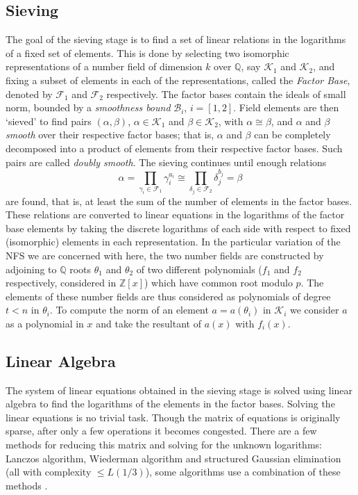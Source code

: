 \documentclass[a4paper, 10pt, envcountsect, runningheads]{lms}
\newcommand{\Q}{\mathbb{Q}}
\newcommand{\Z}{\mathbb{Z}}
\numberwithin{figure}{section}
\numberwithin{equation}{section}
\begin{document}
\subsection*{Sieving}
\label{ss:sieving}
The goal of the sieving stage is to find a set of linear relations in the logarithms of a fixed set of elements. This is done by selecting two isomorphic representations of a number field of dimension $k$ over $\Q$, say $\mathcal{K}_{1}$ and $\mathcal{K}_{2}$, and fixing a subset of elements in each of the representations, called the \textit{Factor Base}, denoted by $\mathcal{F}_{1}$ and $\mathcal{F}_{2}$ respectively. The factor bases contain the ideals of small norm, bounded by a {\em smoothness bound} $\mathcal{B}_{i}$, $i=[1,2]$.
Field elements are then `sieved' to find pairs $(\alpha,\beta)$, $\alpha\in\mathcal{K}_{1}$ and $\beta\in\mathcal{K}_{2}$, with $\alpha\cong\beta$, and $\alpha$ and $\beta$ {\em smooth} over their respective factor bases; that is, $\alpha$ and $\beta$ can be completely decomposed into a product of elements from their respective factor bases. Such pairs are called \textit{doubly smooth}. The sieving continues until enough relations $$\alpha=\prod_{\gamma_{i}\in\mathcal{F}_{1}}\gamma_{i}^{a_{i}}\cong\prod_{\delta_{j}\in\mathcal{F}_{2}}\delta_{j}^{b_{j}}=\beta$$ are found, that is, at least the sum of the number of elements in the factor bases.
These relations are converted to linear equations in the logarithms of the factor base elements by taking the discrete logarithms of each side with respect to fixed (isomorphic) elements in each representation.
In the particular variation of the NFS we are concerned with here, the two number fields are constructed by adjoining to $\Q$ roots $\theta_1$ and $\theta_2$ of two different polynomials ($f_1$ and $f_2$ respectively, considered in $\Z[x]$) which have common root modulo $p$. The elements of these number fields are thus considered as polynomials of degree $t<n$ in $\theta_i$. To compute the norm of an element $a=a(\theta_i)$ in $\mathcal{K}_i$ we consider $a$ as a polynomial in $x$ and take the resultant of $a(x)$ with $f_i(x).$
\subsection*{Linear Algebra}
\label{ss:LinAlg}
The system of linear equations obtained in the sieving stage is solved using linear algebra to find the logarithms of the elements in the factor bases.
Solving the linear equations is no trivial task. Though the matrix of equations is originally sparse, after only a few operations it becomes congested. There are a few methods for reducing this matrix and solving for the unknown logarithms: Lanczos algorithm, Wiederman algorithm and structured Gaussian elimination  (all with complexity $\leq L(1/3)$), some algorithms use a combination of these methods \cite{lamacchia-odlyzko}. 
\end{document}
